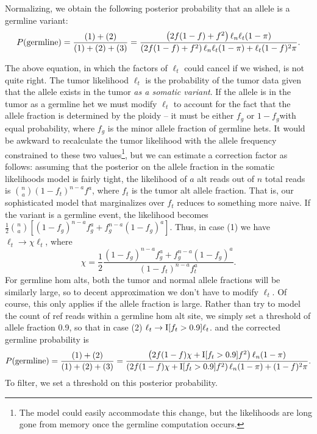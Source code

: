 \documentclass[nofootinbib,amssymb,amsmath]{revtex4}
\begin{document}
Normalizing, we obtain the following posterior probability that an allele is a germline variant:
\begin{equation}
P({\rm germline}) = \frac{(1) + (2)}{(1) + (2) + (3)} = \frac{\left(2f(1-f) + f^2 \right) \ell_n \ell_t (1 - \pi)}{\left(2f(1-f) + f^2 \right) \ell_n \ell_t  (1 - \pi) + \ell_t (1-f)^2  \pi}.
\end{equation}

The above equation, in which the factors of $\ell_t$ could cancel if we wished, is not quite right.  The tumor likelihood $\ell_t$ is the probability of the tumor data given that the allele exists in the tumor \textit{as a somatic variant}.  If the allele is in the tumor as a germline het we must modify $\ell_t$ to account for the fact that the allele fraction is determined by the ploidy -- it must be either $f_g$ or $1- f_g$with equal probability, where $f_g$ is the minor allele fraction of germline hets.  It would be awkward to recalculate the tumor likelihood with the allele frequency constrained to these two values\footnote{The model could easily accommodate this change, but the likelihoods are long gone from memory once the germline computation occurs.}, but we can estimate a correction factor as follows:  assuming that the posterior on the allele fraction in the somatic likelihoods model is fairly tight, the likelihood of $a$ alt reads out of $n$ total reads is $\binom na (1-f_t)^{n-a}f^a$, where $f_t$ is the tumor alt allele fraction.  That is, our sophisticated model that marginalizes over $f_t$ reduces to something more naive.  If the variant is a germline event, the likelihood becomes $\frac{1}{2} \binom na  \left[(1-f_g)^{n-a}f_g^a + f_g^{n-a}(1-f_g)^a \right]$.  Thus, in case (1) we have $\ell_t \rightarrow \chi \ell_t$, where
\begin{equation}
\chi = \frac{1}{2} \frac{(1-f_g)^{n-a}f_g^a + f_g^{n-a}(1-f_g)^a}{(1-f_t)^{n-a}f_t^a}.
\end{equation}
For germline hom alts, both the tumor and normal allele fractions will be similarly large, so to decent approximation we don't have to modify $\ell_t$.  Of course, this only applies if the allele fraction is large.  Rather than try to model the count of ref reads within a germline hom alt site, we simply set a threshold of allele fraction 0.9, so that in case (2) $\ell_t \rightarrow {\rm I}[f_t > 0.9] \ell_t$.
and the corrected germline probability is
\begin{equation}
P({\rm germline}) = \frac{(1) + (2)}{(1) + (2) + (3)} = \frac{\left( 2f(1-f) \chi + {\rm I}[f_t > 0.9] f^2 \right) \ell_n (1 - \pi)}{\left( 2f(1-f) \chi + {\rm I}[f_t > 0.9] f^2 \right) \ell_n  (1 - \pi) + (1-f)^2  \pi}.
\end{equation}
To filter, we set a threshold on this posterior probability.
\end{document}
